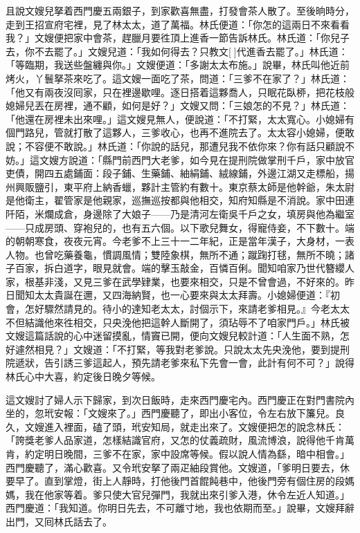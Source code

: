 且說文嫂兒拏着西門慶五兩銀子，到家歡喜無盡，打發會茶人散了。至後晌時分，走到王招宣府宅裡，見了林太太，道了萬福。林氏便道：「你怎的這兩日不來看看我？」文嫂便把家中會茶，趕臘月要徃頂上進香一節告訴林氏。林氏道：「你兒子去，你不去罷了。」文嫂兒道：「我如何得去？只教文[]代進香去罷了。」林氏道：「等臨期，我送些盤纏與你。」文嫂便道：「多謝太太布施。」說畢，林氏叫他近前烤火，丫鬟拏茶來吃了。這文嫂一面吃了茶，問道：「三爹不在家了？」林氏道：「他又有兩夜沒囘家，只在裡邊歇哩。逐日搭着這夥喬人，只眠花臥桺，把花枝般媳婦兒丟在房裡，通不顧，如何是好？」文嫂又問：「三娘怎的不見？」林氏道：「他還在房裡未出來哩。」這文嫂見無人，便說道：「不打緊，太太寬心。小媳婦有個門路兒，管就打散了這夥人，三爹收心，也再不進院去了。太太容小媳婦，便敢說；不容便不敢說。」{}林氏道：「你說的話兒，那遭兒我不依你來？你有話只顧說不妨。」這文嫂方說道：「縣門前西門大老爹，如今見在提刑院做掌刑千戶，家中放官吏債，開四五處鋪面：段子鋪、生藥鋪、紬絹鋪、絨線鋪，外邊江湖又走標船，揚州興販鹽引，東平府上納香蠟，夥計主管約有數十。東京蔡太師是他幹爺，朱太尉是他衛主，翟管家是他親家，巡撫巡按都與他相交，知府知縣是不消說。家中田連阡陌，米爛成倉{}，身邊除了大娘子——乃是清河左衛吳千戶之女，填房與他為繼室——只成房頭、穿袍兒的，也有五六個。以下歌兒舞女，得寵侍妾，不下數十。端的朝朝寒食，夜夜元宵。今老爹不上三十一二年紀，正是當年漢子，大身材，一表人物。也曾吃藥養龜，慣調風情；{}雙陸象棋，無所不通；蹴踘打毬，無所不曉；諸子百家，拆白道字，眼見就會。端的擊玉敲金，百憐百俐。聞知咱家乃世代簪纓人家，根基非淺，又見三爹在武學肄業，也要來相交，只是不曾會過，不好來的。昨日聞知太太貴誕在邇，又四海納賢，{}也一心要來與太太拜壽。小媳婦便道：『初會，怎好驟然請見的。待小的達知老太太，討個示下，來請老爹相見。』今老太太不但結識他來徃相交，只央浼他把這幹人斷開了，須玷辱不了咱家門戶。」林氏被文嫂這篇話說的心中迷留摸亂，情竇已開，便向文嫂兒較計道：「人生面不熟，怎好遽然相見？」文嫂道：「不打緊，等我對老爹說。只說太太先央浼他，要到提刑院遞狀，告引誘三爹這起人，預先請老爹來私下先會一會，此計有何不可？」說得林氏心中大喜，約定後日晚夕等候。

這文嫂討了婦人示下歸家，到次日飯時，走來西門慶宅內。西門慶正在對門書院內坐的，忽玳安報：「文嫂來了。」西門慶聽了，即出小客位，令左右放下簾兒。良久，文嫂進入裡面，磕了頭，玳安知局，就走出來了。文嫂便把怎的說念林氏：「誇獎老爹人品家道，怎樣結識官府，又怎的仗義疏財，風流博浪，說得他千肯萬肯，約定明日晚間，三爹不在家，家中設席等候。假以說人情為繇，暗中相會。」西門慶聽了，滿心歡喜。又令玳安拏了兩疋紬段賞他。文嫂道，「爹明日要去，休要早了。直到掌燈，街上人靜時，打他後門首餛飩巷中{}，他後門旁有個住房的段媽媽，我在他家等着。爹只使大官兒彈門，我就出來引爹入港，休令左近人知道。」西門慶道：「我知道。你明日先去，不可離寸地，我也依期而至。」說畢，文嫂拜辭出門，又囘林氏話去了。


